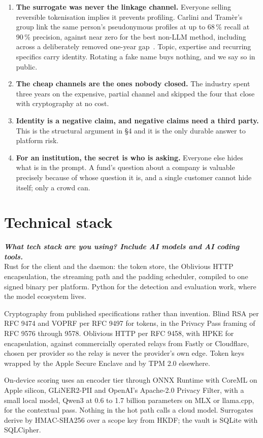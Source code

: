 \documentclass[9pt,twocolumn,a4paper]{extarticle}
\newcommand{\q}[1]{{\fontsize{7}{9}\selectfont\bfseries\itshape\color{indigo!80!black}#1}\\[2pt]}
\begin{document}
\begin{enumerate}[label=\textbf{\arabic*.}]
\item \textbf{The surrogate was never the linkage channel.} Everyone selling reversible tokenisation implies it prevents profiling. Carlini and Tramèr's group link the same person's pseudonymous profiles at up to 68\,\% recall at 90\,\% precision, against near zero for the best non-LLM method, including across a deliberately removed one-year gap~\cite{lermen}. Topic, expertise and recurring specifics carry identity. Rotating a fake name buys nothing, and we say so in public.
\item \textbf{The cheap channels are the ones nobody closed.} The industry spent three years on the expensive, partial channel and skipped the four that close with cryptography at no cost.
\item \textbf{Identity is a negative claim, and negative claims need a third party.} This is the structural argument in \S4 and it is the only durable answer to platform risk.
\item \textbf{For an institution, the secret is who is asking.} Everyone else hides what is in the prompt. A fund's question about a company is valuable precisely because of whose question it is, and a single customer cannot hide itself; only a crowd can.
\end{enumerate}

\section{Technical stack}
\q{What tech stack are you using? Include AI models and AI coding tools.}

Rust for the client and the daemon: the token store, the Oblivious HTTP encapsulation, the streaming path and the padding scheduler, compiled to one signed binary per platform. Python for the detection and evaluation work, where the model ecosystem lives.

Cryptography from published specifications rather than invention. Blind RSA per RFC 9474 and VOPRF per RFC 9497 for tokens, in the Privacy Pass framing of RFC 9576 through 9578. Oblivious HTTP per RFC 9458, with HPKE for encapsulation, against commercially operated relays from Fastly or Cloudflare, chosen per provider so the relay is never the provider's own edge. Token keys wrapped by the Apple Secure Enclave and by TPM 2.0 elsewhere.

On-device scoring uses an encoder tier through ONNX Runtime with CoreML on Apple silicon, GLiNER2-PII and OpenAI's Apache-2.0 Privacy Filter, with a small local model, Qwen3 at 0.6 to 1.7 billion parameters on MLX or llama.cpp, for the contextual pass. Nothing in the hot path calls a cloud model. Surrogates derive by HMAC-SHA256 over a scope key from HKDF; the vault is SQLite with SQLCipher.
\end{document}
